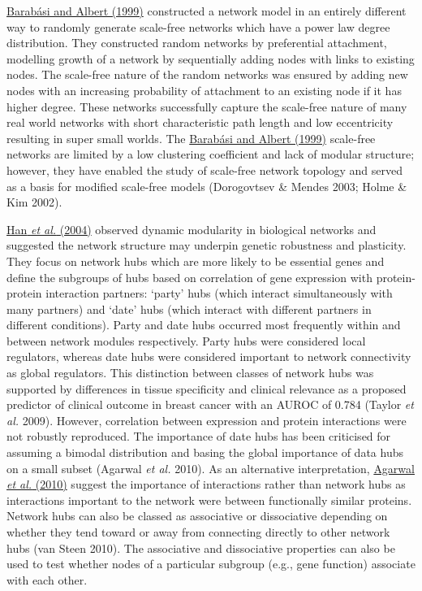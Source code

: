 \iffalse

\hyperlink{ENREF7}{Barab\'asi and Albert (1999)} constructed a network model in an entirely different way to randomly generate scale-free networks which have a power law degree distribution. They constructed random networks by preferential attachment, modelling growth of a network by sequentially adding nodes with links to existing nodes. The scale-free nature of the random networks was ensured by adding new nodes with an increasing probability of attachment to an existing node if it has higher degree. These networks successfully capture the scale-free nature of many real world networks with short characteristic path length and low eccentricity resulting in super small worlds. The \hyperlink{ENREF7}{Barab\'asi and Albert (1999)} scale-free networks are limited by a low clustering coefficient and lack of modular structure; however, they have enabled the study of scale-free network topology and served as a basis for modified scale-free models (Dorogovtsev \& Mendes 2003; Holme \& Kim 2002). 

\hyperlink{ENREF47}{Han}\hyperlink{ENREF47}{\textit{ et al.}}\hyperlink{ENREF47}{ (2004)} observed dynamic modularity in biological networks and suggested the network structure may underpin genetic robustness and plasticity. They focus on network hubs which are more likely to be essential genes and define the subgroups of hubs based on correlation of gene expression with protein-protein interaction partners: `party' hubs (which interact simultaneously with many partners) and `date' hubs (which interact with different partners in different conditions). Party and date hubs occurred most frequently within and between network modules respectively. Party hubs were considered local regulators, whereas date hubs were considered important to network connectivity as global regulators. This distinction between classes of network hubs was supported by differences in tissue specificity and clinical relevance as a proposed predictor of clinical outcome in breast cancer with an AUROC of 0.784 (Taylor\textit{ et al.} 2009). However, correlation between expression and protein interactions were not robustly reproduced. The importance of date hubs has been criticised for assuming a bimodal distribution and basing the global importance of data hubs on a small subset (Agarwal\textit{ et al.} 2010). As an alternative interpretation, \hyperlink{ENREF2}{Agarwal}\hyperlink{ENREF2}{\textit{ et al.}}\hyperlink{ENREF2}{ (2010)} suggest the importance of interactions rather than network hubs as interactions important to the network were between functionally similar proteins. Network hubs can also be classed as associative or dissociative depending on whether they tend toward or away from connecting directly to other network hubs (van Steen 2010). The associative and dissociative properties can also be used to test whether nodes of a particular subgroup (e.g., gene function) associate with each other. 

